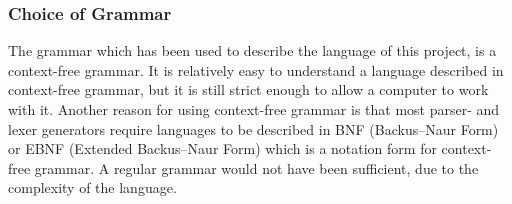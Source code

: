 \subsubsection{Choice of Grammar}
The grammar which has been used to describe the language of this project, is a context-free grammar. It is relatively easy to understand a language described in context-free grammar, but it is still strict enough to allow a computer to work with it. Another reason for using context-free grammar is that most parser- and lexer generators require languages to be described in BNF (Backus–Naur Form) or EBNF (Extended Backus–Naur Form) which is a notation form for context-free grammar. A regular grammar would not have been sufficient, due to the complexity of the language.
